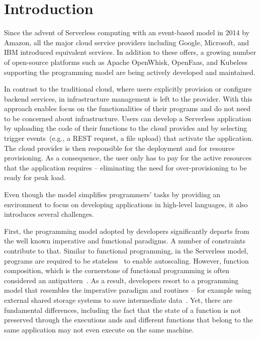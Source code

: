 
\section{Introduction}

Since the advent of Serverless computing with an event-based \faas model in 2014 by 
Amazon,
all the major cloud service providers including 
Google,
Microsoft,
and IBM
introduced equivalent services. 
%
In addition to these offers, a growing number of open-source platforms 
such as Apache OpenWhisk,
OpenFaas,
and Kubeless
supporting the \faas programming model are being actively developed and maintained.

In contrast to the traditional cloud, where users explicitly provision or configure 
backend services, in \faas infrastructure management is left to the provider.
With this approach enables focus on the functionalities of their programs 
and do not need to be concerned about infrastructure. 
Users can develop a Serverless application by uploading the code of their 
functions to the cloud provides and by selecting trigger events~(e.g., a REST request, 
a file upload) that activate the application. The cloud provider is then responsible for the deployment 
and for resource provisioning. As a consequence, the user only has 
to pay for the active resources that the application requires -- eliminating the 
need for over-provisioning to be ready for peak load.

Even though the \faas model simplifies programmers' tasks by providing 
an environment to focus on developing applications in high-level 
languages, it also introduces several challenges.

First, the programming model adopted by developers 
significantly departs from the well known imperative and functional paradigms.
A number of constraints contribute to that.
Similar to functional programming, in the Serverless model, 
programs are required to be stateless~\cite{hellerstein2018serverless} to enable autoscaling.
However, function composition, which is the cornerstone of functional programming
is often considered an antipattern~\cite{TODO}.
%
As a result, developers resort to a programming model that 
resembles the imperative paradigm and routines --
for example using external shared 
storage systems to save intermediate data~\cite{klimovic2018understanding}.
Yet, there are fundamental differences, including the fact that 
the state of a function is not preserved through the executions ands and
different functions that belong to the same application may not even execute 
on the same machine.


